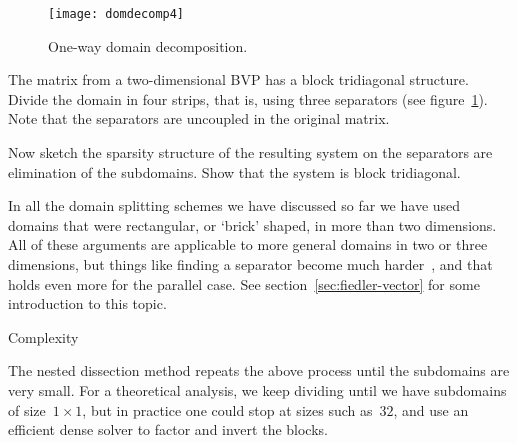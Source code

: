 \begin{figure}[ht]
  \texttt{[image: domdecomp4]}
  \caption{One-way domain decomposition.}
  \label{fig:domdecomp4}
\end{figure}

\begin{exercise}
  The matrix from a two-dimensional \ac{BVP} has a block tridiagonal
  structure. Divide the domain in four strips, that is, using three
  separators (see figure~\ref{fig:domdecomp4}). Note that the
  separators are uncoupled in the original matrix.

  Now sketch the sparsity structure of the resulting system on the
  separators are elimination of the subdomains. Show that the system
  is block tridiagonal.
\end{exercise}

In all the domain splitting schemes we have discussed so far we have
used domains that were rectangular, or `brick' shaped, in more than
two dimensions. All of these arguments are applicable to more general
domains in two or three dimensions, but things like finding a
separator become much harder~\cite{LiRoTa:dissection}, and that holds
even more for the parallel case. See section~\ref{sec:fiedler-vector}
for some introduction to this topic.

 {Complexity}

The nested dissection method repeats the above process until the
subdomains are very small.  For a theoretical analysis, we keep
dividing until we have subdomains of size~$1\times1$, but in practice
one could stop at sizes such as~$32$, and use an efficient dense
solver to factor and invert the blocks.

